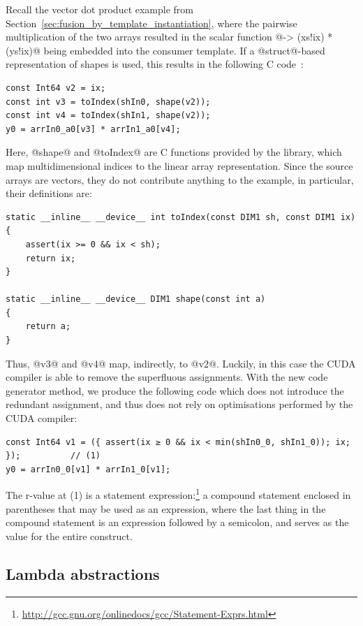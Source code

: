 Recall the vector dot product example from
Section~\ref{sec:fusion_by_template_instantiation}, where the pairwise
multiplication of the two arrays resulted in the scalar function
@\ix -> (xs!ix) * (ys!ix)@ being embedded into the consumer template. If a
@struct@-based representation of shapes is used, this results in the following
C code~\cite{CliftonEverest:2014vi}:
%
\begin{lstlisting}[style=cuda]
const Int64 v2 = ix;
const int v3 = toIndex(shIn0, shape(v2));
const int v4 = toIndex(shIn1, shape(v2));
y0 = arrIn0_a0[v3] * arrIn1_a0[v4];
\end{lstlisting}
%
Here, @shape@ and @toIndex@ are C functions provided by the library, which map
multidimensional indices to the linear array representation. Since the source
arrays are vectors, they do not contribute anything to the example, in
particular, their definitions are:
%
\begin{lstlisting}[style=cuda]
static __inline__ __device__ int toIndex(const DIM1 sh, const DIM1 ix)
{
    assert(ix >= 0 && ix < sh);
    return ix;
}

static __inline__ __device__ DIM1 shape(const int a)
{
    return a;
}
\end{lstlisting}
%
Thus, @v3@ and @v4@ map, indirectly, to @v2@. Luckily, in this case the CUDA
compiler is able to remove the superfluous assignments. With the new code
generator method, we produce the following code which does not introduce the
redundant assignment, and thus does not rely on optimisations performed by the
CUDA compiler:
%
\begin{lstlisting}[style=cuda]
const Int64 v1 = ({ assert(ix ≥ 0 && ix < min(shIn0_0, shIn1_0)); ix; });          // (1)
y0 = arrIn0_0[v1] * arrIn1_0[v1];
\end{lstlisting}
%
The r-value at (1) is a statement
expression:\footnote{\url{http://gcc.gnu.org/onlinedocs/gcc/Statement-Exprs.html}}
a compound statement enclosed in parentheses that may be used as an expression,
where the last thing in the compound statement is an expression followed by a
semicolon, and serves as the value for the entire construct.

\cg[shapes|)]{}

\subsection{Lambda abstractions}


